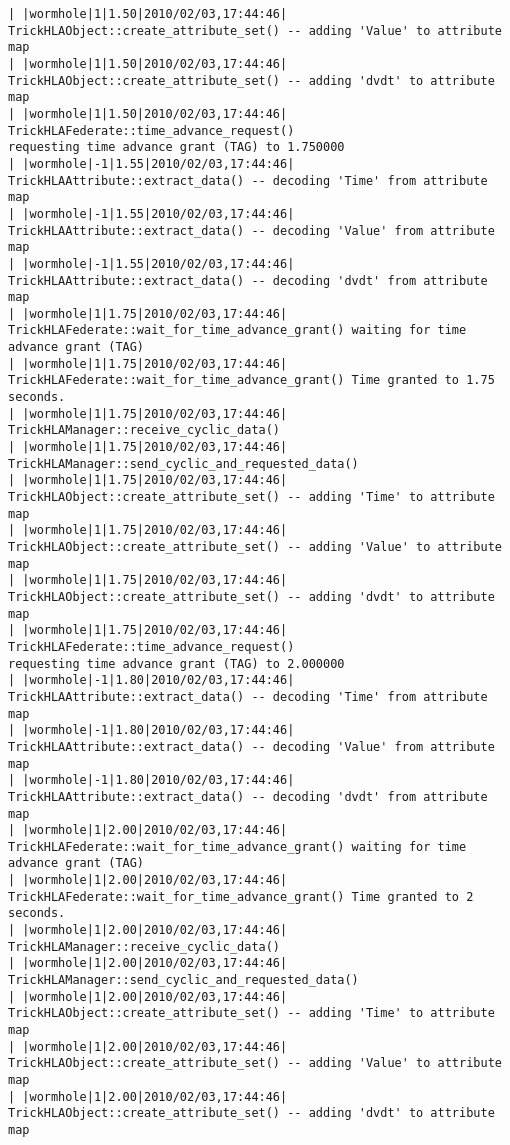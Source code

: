 \begin{lstlisting}[numbers=none,caption={output showing conditionally sent cyclic data}]
| |wormhole|1|1.50|2010/02/03,17:44:46| TrickHLAObject::create_attribute_set() -- adding 'Value' to attribute map
| |wormhole|1|1.50|2010/02/03,17:44:46| TrickHLAObject::create_attribute_set() -- adding 'dvdt' to attribute map
| |wormhole|1|1.50|2010/02/03,17:44:46| TrickHLAFederate::time_advance_request()   
requesting time advance grant (TAG) to 1.750000
| |wormhole|-1|1.55|2010/02/03,17:44:46| TrickHLAAttribute::extract_data() -- decoding 'Time' from attribute map
| |wormhole|-1|1.55|2010/02/03,17:44:46| TrickHLAAttribute::extract_data() -- decoding 'Value' from attribute map
| |wormhole|-1|1.55|2010/02/03,17:44:46| TrickHLAAttribute::extract_data() -- decoding 'dvdt' from attribute map
| |wormhole|1|1.75|2010/02/03,17:44:46| TrickHLAFederate::wait_for_time_advance_grant() waiting for time advance grant (TAG)
| |wormhole|1|1.75|2010/02/03,17:44:46| TrickHLAFederate::wait_for_time_advance_grant() Time granted to 1.75 seconds.
| |wormhole|1|1.75|2010/02/03,17:44:46| TrickHLAManager::receive_cyclic_data()
| |wormhole|1|1.75|2010/02/03,17:44:46| TrickHLAManager::send_cyclic_and_requested_data()
| |wormhole|1|1.75|2010/02/03,17:44:46| TrickHLAObject::create_attribute_set() -- adding 'Time' to attribute map
| |wormhole|1|1.75|2010/02/03,17:44:46| TrickHLAObject::create_attribute_set() -- adding 'Value' to attribute map
| |wormhole|1|1.75|2010/02/03,17:44:46| TrickHLAObject::create_attribute_set() -- adding 'dvdt' to attribute map
| |wormhole|1|1.75|2010/02/03,17:44:46| TrickHLAFederate::time_advance_request()   
requesting time advance grant (TAG) to 2.000000
| |wormhole|-1|1.80|2010/02/03,17:44:46| TrickHLAAttribute::extract_data() -- decoding 'Time' from attribute map
| |wormhole|-1|1.80|2010/02/03,17:44:46| TrickHLAAttribute::extract_data() -- decoding 'Value' from attribute map
| |wormhole|-1|1.80|2010/02/03,17:44:46| TrickHLAAttribute::extract_data() -- decoding 'dvdt' from attribute map
| |wormhole|1|2.00|2010/02/03,17:44:46| TrickHLAFederate::wait_for_time_advance_grant() waiting for time advance grant (TAG)
| |wormhole|1|2.00|2010/02/03,17:44:46| TrickHLAFederate::wait_for_time_advance_grant() Time granted to 2 seconds.
| |wormhole|1|2.00|2010/02/03,17:44:46| TrickHLAManager::receive_cyclic_data()
| |wormhole|1|2.00|2010/02/03,17:44:46| TrickHLAManager::send_cyclic_and_requested_data()
| |wormhole|1|2.00|2010/02/03,17:44:46| TrickHLAObject::create_attribute_set() -- adding 'Time' to attribute map
| |wormhole|1|2.00|2010/02/03,17:44:46| TrickHLAObject::create_attribute_set() -- adding 'Value' to attribute map
| |wormhole|1|2.00|2010/02/03,17:44:46| TrickHLAObject::create_attribute_set() -- adding 'dvdt' to attribute map

\end{lstlisting}
